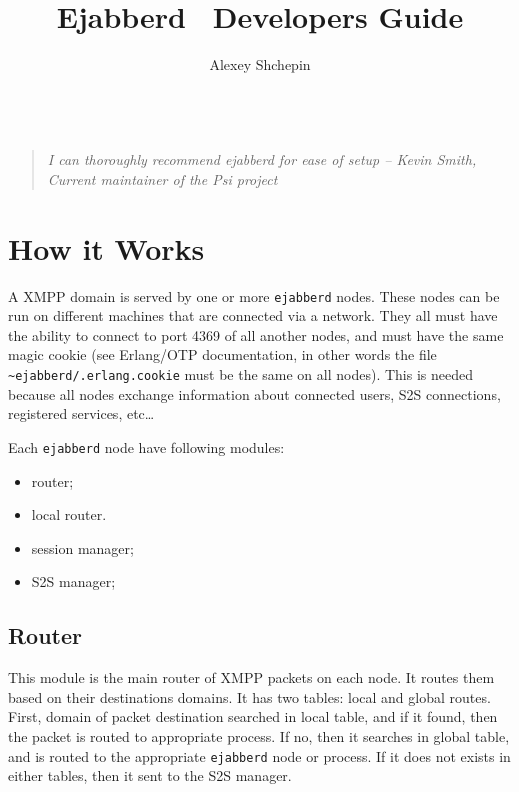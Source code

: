 \documentclass[a4paper,10pt]{article}
\title{Ejabberd \version\ Developers Guide}
\author{Alexey Shchepin \\
  \ahrefurl{mailto:alexey@sevcom.net} \\
  \ahrefurl{xmpp:aleksey@jabber.ru}}
\newcommand{\logoscale}{0.7}
\newcommand{\insscaleimg}[2]{
  \imgsrc{#2}{}
  \begin{latexonly}
    \scalebox{#1}{\texttt{[image: \#2]}}
  \end{latexonly}
}
\newcommand{\ejabberd}{\texttt{ejabberd}}
\newcommand{\XMPP}{XMPP}
\begin{document}
\label{titlepage}
\begin{titlepage}
  \maketitle{}

  \begin{center}
  {\insscaleimg{\logoscale}{logo.png}
    \par
  }
  \end{center}

  \begin{quotation}\textit{I can thoroughly recommend ejabberd for ease of setup --
  Kevin Smith, Current maintainer of the Psi project}\end{quotation}

\end{titlepage}

\tableofcontents{}



\section{How it Works}
\label{howitworks}


A \XMPP{} domain is served by one or more \ejabberd{} nodes.  These nodes can
be run on different machines that are connected via a network.  They all must
have the ability to connect to port 4369 of all another nodes, and must have
the same magic cookie (see Erlang/OTP documentation, in other words the file
\texttt{\~{}ejabberd/.erlang.cookie} must be the same on all nodes). This is
needed because all nodes exchange information about connected users, S2S
connections, registered services, etc\ldots



Each \ejabberd{} node have following modules:
\begin{itemize}
\item router;
\item local router.
\item session manager;
\item S2S manager;
\end{itemize}


\subsection{Router}

This module is the main router of \XMPP{} packets on each node.  It routes
them based on their destinations domains.  It has two tables: local and global
routes.  First, domain of packet destination searched in local table, and if it
found, then the packet is routed to appropriate process.  If no, then it
searches in global table, and is routed to the appropriate \ejabberd{} node or
process.  If it does not exists in either tables, then it sent to the S2S
manager.
\end{document}

